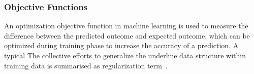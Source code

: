 \subsubsection{Objective Functions}
An optimization objective function in machine learning is used to measure the difference between the predicted outcome and expected outcome, which can be optimized during training phase to increase the accuracy of a prediction. A typical The collective efforts to generalize the underline data structure within training data is summarised as regularization term~\cite{goodfellow_2015}.  